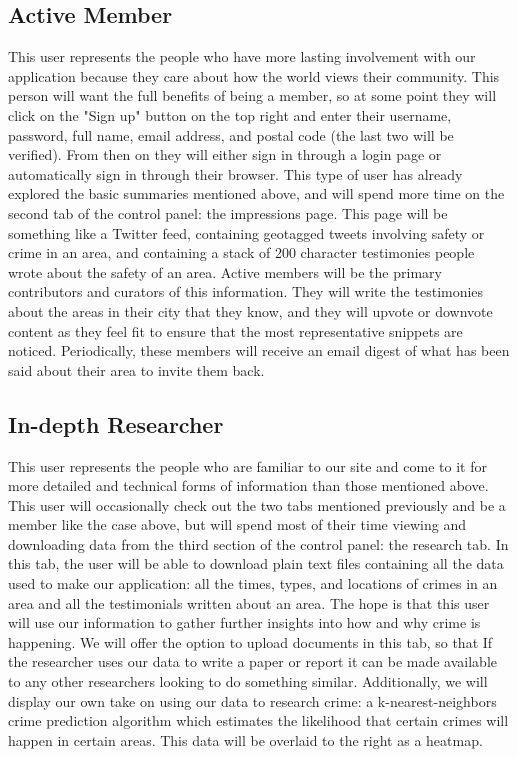 \documentclass[paper=a4, fontsize=11pt]{scrartcl} %
\numberwithin{equation}{section} %
\numberwithin{figure}{section} %
\numberwithin{table}{section} %
\begin{document}
\subsection{Active Member}

This user represents the people who have more lasting involvement with our application because they care about how the world views their community. This person will want the full benefits of being a member, so at some point they will click on the "Sign up" button on the top right and enter their username, password, full name, email address, and postal code (the last two will be verified). From then on they will either sign in through a login page or automatically sign in through their browser. This type of user has already explored the basic summaries mentioned above, and will spend more time on the second tab of the control panel: the impressions page. This page will be something like a Twitter feed, containing geotagged tweets involving safety or crime in an area, and containing a stack of 200 character testimonies people wrote about the safety of an area. Active members will be the primary contributors and curators of this information. They will write the testimonies about the areas in their city that they know, and they will upvote or downvote content as they feel fit to ensure that the most representative snippets are noticed. Periodically, these members will receive an email digest of what has been said about their area to invite them back.


\subsection{In-depth Researcher}

This user represents the people who are familiar to our site and come to it for more detailed and technical forms of information than those mentioned above. This user will occasionally check out the two tabs mentioned previously and be a member like the case above, but will spend most of their time viewing and downloading data from the third section of the control panel: the research tab. In this tab, the user will be able to download plain text files containing all the data used to make our application: all the times, types, and locations of crimes in an area and all the testimonials written about an area. The hope is that this user will use our information to gather further insights into how and why crime is happening. We will offer the option to upload documents in this tab, so that If the researcher uses our data to write a paper or report it can be made available to any other researchers looking to do something similar. Additionally, we will display our own take on using our data to research crime: a k-nearest-neighbors crime prediction algorithm which estimates the likelihood that certain crimes will happen in certain areas. This data will be overlaid to the right as a heatmap.
\end{document}
